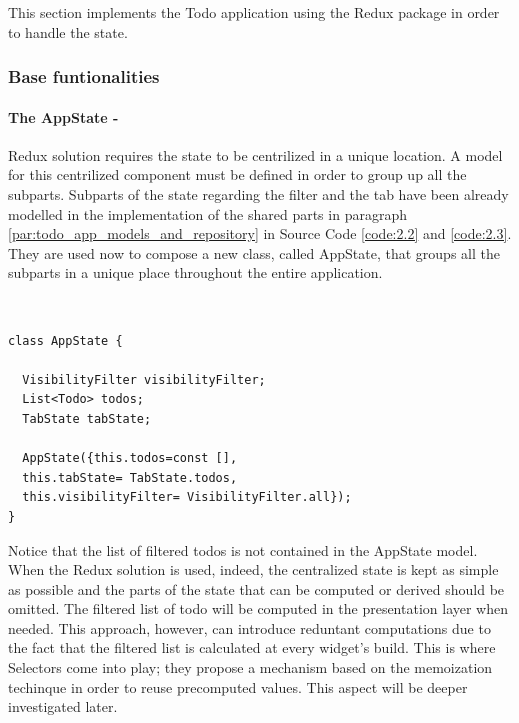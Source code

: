 This section implements the Todo application using the Redux package in order to handle the state. 
\subsubsection{Base funtionalities} \label{par:todo_app_inherited_widget_introduction}

\paragraph{The AppState - }
\label{subpar:todo_app_bloc_core_state}
Redux solution requires the state to be centrilized in a unique location. A model for this centrilized component must be defined in order to group up all the subparts. Subparts of the state regarding the filter and the tab have been already modelled in the implementation of the shared parts in paragraph  \ref{par:todo_app_models_and_repository} in Source Code \ref{code:2.2} and \ref{code:2.3}. They are used now to compose a new class, called AppState, that groups all the subparts in a unique place throughout the entire application. 
\begin{code}
\mbox{}\\
 \mbox{}
		\label{code:2.14}
\begin{verbatim}
class AppState {

  VisibilityFilter visibilityFilter;
  List<Todo> todos;
  TabState tabState;

  AppState({this.todos=const [],
  this.tabState= TabState.todos,
  this.visibilityFilter= VisibilityFilter.all});
}
\end{verbatim}
\mbox{}
\end{code}

Notice that the list of filtered todos is not contained in the AppState model. When the Redux solution is used, indeed, the centralized state is kept as simple as possible and the parts of the state that can be computed or derived should be omitted. The filtered list of todo will be computed in the presentation layer when needed. This approach, however, can introduce reduntant computations due to the fact that the filtered list is calculated at every widget's build. This is where Selectors come into play; they propose a mechanism based on the memoization techinque in order to reuse precomputed values. This aspect will be deeper investigated later.
